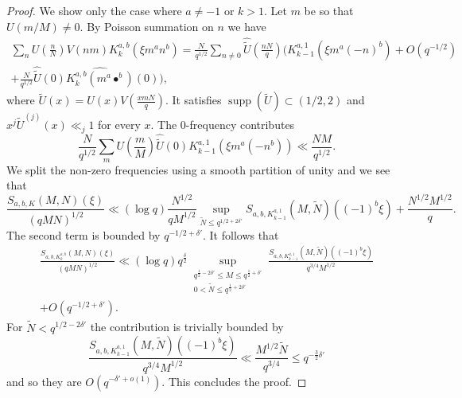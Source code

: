 \documentclass[12pt]{amsart}
\theoremstyle{plain}
\theoremstyle{definition}
\theoremstyle{remark}
\numberwithin{equation}{section}
\renewcommand{\leq}{\leqslant}
\begin{document}
\begin{proof} We show only the case where $a\neq -1$ or $k>1$.  
Let $m$ be so that $U(m/M)\neq 0$. By Poisson summation on $n$ we have 
\begin{align*}\sum_{n}U\left(\frac{n}{N}\right)V(nm)K_k^{a,b}(\xi m^an^b) = \frac{N}{q^{1/2}}\sum_{n\neq 0} \widehat{\tilde U}\left(\frac{nN}{q}\right)\bigg(K_{k-1}^{a,1}(\xi m^a(-n)^b)+O(q^{-1/2}) \\+\frac{N}{q^{1/2}}\widehat{\tilde U}(0)\widehat{K^{a,b}_{k}(m^a\bullet^b)}(0)\bigg), 
\end{align*}
where $\tilde{U}(x) = U(x) V\left(\frac{xmN}{q}\right)$. It satisfies $\operatorname{supp}(\tilde{U}) \subset (1/2,2)$ and $ x^j\tilde{U}^{(j)}(x)\ll_j 1$ for every $x$. The $0$-frequency contributes 
\[\frac{N}{q^{1/2}}\sum_{m}U\left(\frac{m}{M}\right)\widehat{\tilde U }(0) K_{k-1}^{a,1}(\xi m^a(-n^b)) \ll \frac{NM}{q^{1/2}}. \]
We split the non-zero frequencies using a smooth partition of unity and we see that
\[\frac{S_{a,b,K}(M,N)(\xi)}{(qMN)^{1/2}} \ll (\log q)\frac{N^{1/2}}{qM^{1/2}}\sup_{\tilde{N}\leq q^{1/2+2\delta'}}S_{a,b,K_{k-1}^{a,1}}(M,\tilde N)((-1)^b\xi) + \frac{N^{1/2}M^{1/2}}{q}.\]
The second term is bounded by $q^{-1/2+\delta'}$. It follows that 
\begin{align*}\frac{S_{a,b,K_k^{a,b}}(M,N)(\xi)}{(qMN)^{1/2}} \ll  (\log q )q^{\frac{\delta}{2}}  \sup_{\substack{q^{\frac{1}{2}-2\delta'}\leq M \leq q^{\frac{1}{2}+\delta'}\\0< \tilde N \leq q^{\frac{1}{2}+2\delta'}}}\frac{S_{a,b,K_{k-1}^{a,1}}(M,\tilde N)((-1)^b\xi)}{q^{3/4}M^{1/2}} \\+ O(q^{-1/2+\delta'}).  \end{align*}
For $\tilde{N}< q^{1/2-2\delta'}$ the contribution is trivially bounded by 
\[\frac{S_{a,b,K^{a,1}_{k-1}}(M,\tilde N)((-1)^b\xi)}{q^{3/4}M^{1/2}} \ll \frac{M^{1/2}\tilde N}{q^{3/4}} \leq q^{-\frac{3}{2}\delta'} \]
and so they are $O(q^{-{\delta'}+o(1)})$. 
This concludes the proof. 
\end{proof}
\end{document}
